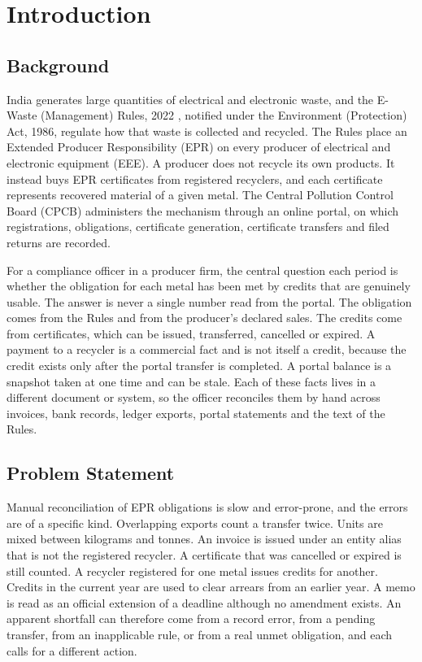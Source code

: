 \chapter{Introduction}
\label{ch:intro}

\section{Background}
India generates large quantities of electrical and electronic waste, and the E-Waste (Management)
Rules, 2022 \cite{ewaste2022}, notified under the Environment (Protection) Act, 1986, regulate how that
waste is collected and recycled. The Rules place an Extended Producer Responsibility (EPR) on every
producer of electrical and electronic equipment (EEE). A producer does not recycle its own products. It
instead buys EPR certificates from registered recyclers, and each certificate represents recovered
material of a given metal. The Central Pollution Control Board (CPCB) administers the mechanism through an
online portal, on which registrations, obligations, certificate generation, certificate transfers and
filed returns are recorded.

For a compliance officer in a producer firm, the central question each period is whether the obligation
for each metal has been met by credits that are genuinely usable. The answer is never a single number
read from the portal. The obligation comes from the Rules and from the producer's declared sales. The
credits come from certificates, which can be issued, transferred, cancelled or expired. A payment to a
recycler is a commercial fact and is not itself a credit, because the credit exists only after the
portal transfer is completed. A portal balance is a snapshot taken at one time and can be stale. Each
of these facts lives in a different document or system, so the officer reconciles them by hand across
invoices, bank records, ledger exports, portal statements and the text of the Rules.

\section{Problem Statement}
Manual reconciliation of EPR obligations is slow and error-prone, and the errors are of a specific kind.
Overlapping exports count a transfer twice. Units are mixed between kilograms and tonnes. An invoice is
issued under an entity alias that is not the registered recycler. A certificate that was cancelled or
expired is still counted. A recycler registered for one metal issues credits for another. Credits in the
current year are used to clear arrears from an earlier year. A memo is read as an official extension of a
deadline although no amendment exists. An apparent shortfall can therefore come from a record error, from
a pending transfer, from an inapplicable rule, or from a real unmet obligation, and each calls for a
different action.

